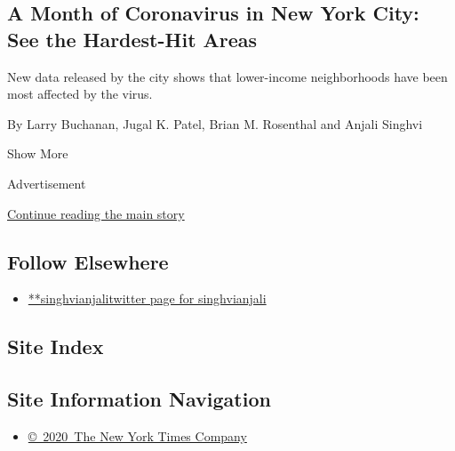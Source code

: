 \begin{enumerate}
  \hypertarget{a-month-of-coronavirus-in-new-york-city-see-the-hardest-hit-areas}{%
  \subsection{A Month of Coronavirus in New York City: See the
  Hardest-Hit
  Areas}\label{a-month-of-coronavirus-in-new-york-city-see-the-hardest-hit-areas}}

  New data released by the city shows that lower-income neighborhoods
  have been most affected by the virus.

  By Larry Buchanan, Jugal K. Patel, Brian M. Rosenthal and Anjali
  Singhvi
\end{enumerate}

Show More

Advertisement

\protect\hyperlink{after-mid2}{Continue reading the main story}

\hypertarget{follow-elsewhere}{%
\subsection{Follow Elsewhere}\label{follow-elsewhere}}

\begin{itemize}
\tightlist
\item
  \href{https://twitter.com/singhvianjali}{**singhvianjalitwitter page
  for singhvianjali}
\end{itemize}

\hypertarget{site-index}{%
\subsection{Site Index}\label{site-index}}

\hypertarget{site-information-navigation}{%
\subsection{Site Information
Navigation}\label{site-information-navigation}}

\begin{itemize}
\tightlist
\item
  \href{https://help.nytimes.com/hc/en-us/articles/115014792127-Copyright-notice}{©~2020~The
  New York Times Company}
\end{itemize}

